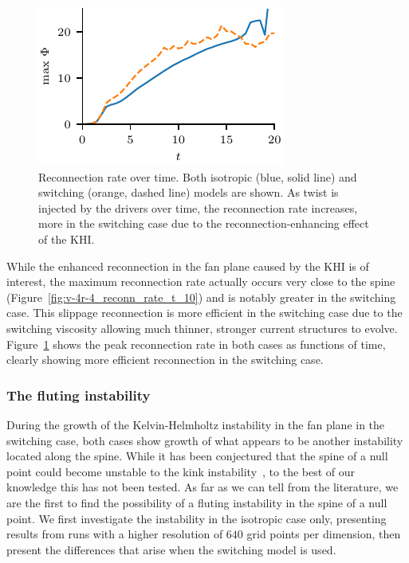 \begin{figure}[t]
  \centering
  \includegraphics[width=0.5\linewidth]{v-4r-4_reconn_rate_over_time}
  \caption{Reconnection rate over time. Both isotropic (blue, solid line) and switching (orange, dashed line) models are shown. As twist is injected by the drivers over time, the reconnection rate increases, more in the switching case due to the reconnection-enhancing effect of the KHI.}%
  \label{fig:v-4r-4_reconn_rate_over_time}
\end{figure}

While the enhanced reconnection in the fan plane caused by the KHI is of interest, the maximum reconnection rate actually occurs very close to the spine (Figure~\ref{fig:v-4r-4_reconn_rate_t_10}) and is notably greater in the switching case. This slippage reconnection is more efficient in the switching case due to the switching viscosity allowing much thinner, stronger current structures to evolve. Figure~\ref{fig:v-4r-4_reconn_rate_over_time} shows the peak reconnection rate in both cases as functions of time, clearly showing more efficient reconnection in the switching case.

\subsubsection{The fluting instability}

During the growth of the Kelvin-Helmholtz instability in the fan plane in the switching case, both cases show growth of what appears to be another instability located along the spine. While it has been conjectured that the spine of a null point could become unstable to the kink instability~\cite{wyperKelvinHelmholtzInstabilityCurrentvortex2013}, to the best of our knowledge this has not been tested. As far as we can tell from the literature, we are the first to find the possibility of a fluting instability in the spine of a null point. We first investigate the instability in the isotropic case only, presenting results from runs with a higher resolution of $640$ grid points per dimension, then present the differences that arise when the switching model is used.

